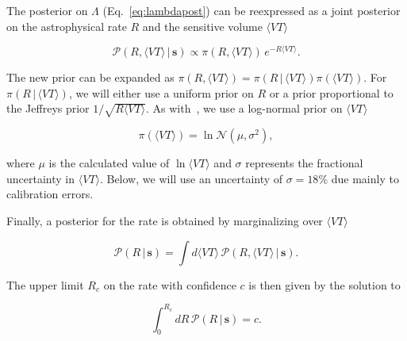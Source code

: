 The posterior on $\Lambda$ (Eq.~\ref{eq:lambdapost}) can be reexpressed as a joint
posterior on the astrophysical rate $R$ and the sensitive volume  $\langle VT \rangle$
\begin{linenomath*}
\begin{equation}
    \mathcal{P}(R, \langle VT \rangle \, | \, \mathbf{s}) \propto \pi(R, \langle VT \rangle) \, e^{-R \langle VT \rangle}.
\end{equation}
\end{linenomath*}
%
The new prior can be expanded as $\pi(R, \langle VT \rangle) = \pi(R \, | \, \langle VT \rangle) \pi(\langle VT \rangle)$. 
For $\pi(R \, | \, \langle VT \rangle)$, we will either use a uniform prior on $R$ or a prior proportional to the 
Jeffreys prior $1/\sqrt{R \langle VT \rangle}$. As with~\citep{Abbott:2016nhf, Abbott:2016drs, TheLIGOScientific:2016pea}, 
we use a log-normal prior on $\langle VT \rangle$
%
\begin{linenomath*}
\begin{equation}
\pi(\langle VT \rangle) = \ln \mathcal{N}(\mu, \sigma^2),
\end{equation}
\end{linenomath*}
%
where $\mu$ is the calculated value of $\ln\langle VT \rangle$ and $\sigma$ represents the fractional uncertainty
in $\langle VT \rangle$. Below, we will use an uncertainty of
$\sigma=18\%$ due mainly to calibration errors.

Finally, a posterior for the rate is obtained by marginalizing over $\langle VT \rangle$
%
\begin{linenomath*}
\begin{equation}
\mathcal{P}(R \, | \, \mathbf{s}) = \int d\langle VT \rangle\, \mathcal{P} (R, \langle VT \rangle \, | \, \mathbf{s}).
\label{eq:posterior}
\end{equation}
\end{linenomath*}
%
The upper limit $R_c$ on the rate with confidence $c$ is then given by the solution to
%
\begin{linenomath*}
\begin{equation}
\label{eq:upperlimit}
\int_0^{R_c} dR\, \mathcal{P}(R \, | \, \mathbf{s}) = c.
\end{equation}
\end{linenomath*}

